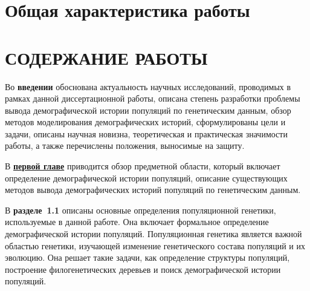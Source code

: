 
\section*{Общая характеристика работы} %



\newpage

\section*{СОДЕРЖАНИЕ РАБОТЫ}

Во \textbf{введении} обоснована актуальность научных исследований, проводимых в рамках данной диссертационной работы, описана степень разработки проблемы вывода демографической истории популяций по генетическим данным, обзор методов моделирования демографических историй, сформулированы цели и задачи, описаны научная новизна, теоретическая и практическая значимости работы, а также перечислены положения, выносимые на защиту.

В \underline{\textbf{первой главе}} приводится обзор предметной области, который включает определение демографической истории популяций, описание существующих методов вывода демографических историй популяций по генетическим данным.

В \textbf{разделе~1.1} описаны основные определения популяционной генетики, используемые в данной работе.
Она включает формальное определение демографической истории популяций.
Популяционная генетика является важной областью генетики, изучающей изменение генетического состава популяций и их эволюцию.
Она решает такие задачи, как определение структуры популяций, построение филогенетических деревьев и поиск демографической истории популяций.


